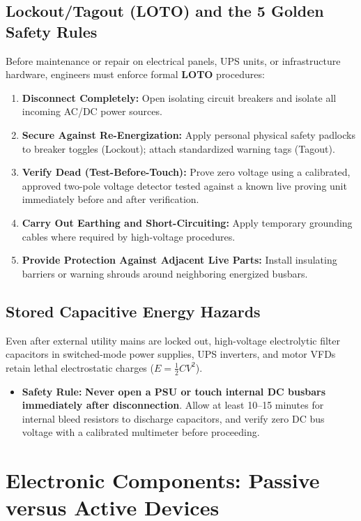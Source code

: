 \subsection{Lockout/Tagout (LOTO) and the 5 Golden Safety Rules}
Before maintenance or repair on electrical panels, UPS units, or infrastructure hardware, engineers must enforce formal \textbf{LOTO} procedures:
\begin{enumerate}[label=\bfseries\arabic*.]
    \item \textbf{Disconnect Completely:} Open isolating circuit breakers and isolate all incoming AC/DC power sources.
    \item \textbf{Secure Against Re-Energization:} Apply personal physical safety padlocks to breaker toggles (Lockout); attach standardized warning tags (Tagout).
    \item \textbf{Verify Dead (Test-Before-Touch):} Prove zero voltage using a calibrated, approved two-pole voltage detector tested against a known live proving unit immediately before and after verification.
    \item \textbf{Carry Out Earthing and Short-Circuiting:} Apply temporary grounding cables where required by high-voltage procedures.
    \item \textbf{Provide Protection Against Adjacent Live Parts:} Install insulating barriers or warning shrouds around neighboring energized busbars.
\end{enumerate}

\subsection{Stored Capacitive Energy Hazards}
Even after external utility mains are locked out, high-voltage electrolytic filter capacitors in switched-mode power supplies, UPS inverters, and motor VFDs retain lethal electrostatic charges ($E = \frac{1}{2} C V^2$).
\begin{itemize}
    \item \textbf{Safety Rule:} \textbf{Never open a PSU or touch internal DC busbars immediately after disconnection}. Allow at least 10--15 minutes for internal bleed resistors to discharge capacitors, and verify zero DC bus voltage with a calibrated multimeter before proceeding.
\end{itemize}

\section{Electronic Components: Passive versus Active Devices}
\label{sec:components_overview}

